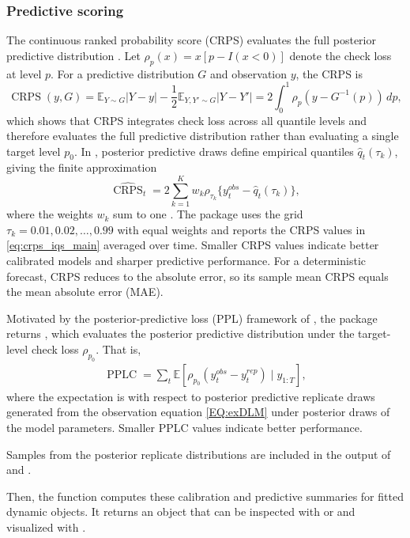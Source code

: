\documentclass{jss}
\newcommand{\CRPS}{\operatorname{CRPS}}
\newcommand{\PPLC}{\operatorname{PPLC}}
\renewcommand{\E}{\mathbb{E}}
\begin{document}
\subsubsection{Predictive scoring}
The continuous ranked probability score (CRPS) evaluates the full posterior predictive distribution \citep{gneiting2007}.
Let $\rho_p(x)=x[p-I(x<0)]$ denote the check loss at level $p$. For a predictive distribution $G$ and observation $y$, the CRPS is
\begin{equation}
\CRPS(y,G)=\mathbb{E}_{Y\sim G}|Y-y|-\frac{1}{2}\mathbb{E}_{Y,Y'\sim G}|Y-Y'|
=2\int_0^1 \rho_p\!\left(y-G^{-1}(p)\right)\,dp,
\label{eq:crps_main}
\end{equation}
which shows that CRPS integrates check loss across all quantile levels and therefore evaluates the full predictive distribution rather than evaluating a single target level \(p_0\). In , posterior predictive draws define empirical quantiles \(\widehat q_t(\tau_k)\), giving the finite approximation
\begin{equation}
\widehat{\CRPS}_t
=
2\sum_{k=1}^{K} w_k
\rho_{\tau_k}\{y_t^{obs}-\widehat q_t(\tau_k)\},
\label{eq:crps_iqs_main}
\end{equation}
where the weights \(w_k\) sum to one \citep{laio2007verification}. The package uses the grid \(\tau_k=0.01,0.02,\ldots,0.99\) with equal weights and reports the CRPS values in \eqref{eq:crps_iqs_main} averaged over time. Smaller CRPS values indicate better calibrated models and sharper predictive performance. For a deterministic forecast, CRPS reduces to the absolute error, so its sample mean CRPS equals the mean absolute error (MAE).

Motivated by the posterior-predictive loss (PPL) framework of \cite{gelfand1998model}, the package returns , which evaluates the posterior predictive distribution under the target-level check loss $\rho_{p_0}$. That is,
\begin{align}
\PPLC = \sum_t \E[\rho_{p_0} (y_t^{obs}-y^{rep}_t) \mid y_{1:T}],
\label{eq:pplc_main}
\end{align}
where the expectation is with respect to posterior predictive replicate draws generated from the observation equation \eqref{EQ:exDLM} under posterior draws of the model parameters.
Smaller PPLC values indicate better performance.

Samples from the posterior replicate distributions are included in the output of  and .

Then, the function  computes these calibration and predictive summaries for fitted dynamic objects. It returns an  object that can be inspected with  or  and visualized with .
\end{document}
